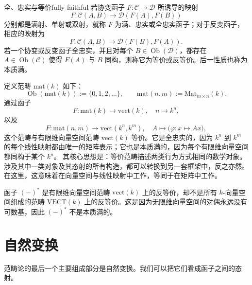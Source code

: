 \begin{definition}{全、忠实与等价}{fully-faithful}
若协变函子 $F\colon\mathcal C\to\mathcal D$ 所诱导的映射
\[
  F\colon\mathcal C(A,B)\to\mathcal D(F(A),F(B))
\]
分别都是满射、单射或双射，就称 $F$ 为满、忠实或全忠实函子；对于反变函子，相应的映射为
\[
  F\colon\mathcal C(A,B)\to\mathcal D(F(B),F(A)).
\]若一个协变或反变函子全忠实，并且对每个 $B\in\operatorname{Ob}(\mathcal D)$，都存在 $A\in\operatorname{Ob}(\mathcal C)$ 使得 $F(A)$ 与 $B$ 同构，则称它为等价或反等价。后一性质也称为本质满。
\end{definition}

\begin{example}[矩阵范畴]\label{ex:matrix-category}
定义范畴 $\mathrm{mat}(k)$ 如下：
\[
\operatorname{Ob}(\mathrm{mat}(k)):=\{0,1,2,\ldots\},\qquad
\mathrm{mat}(n,m):=\mathrm{Mat}_{m\times n}(k).
\]
通过函子
\[
F\colon\mathrm{mat}(k)\to\mathrm{vect}(k),\quad n\longmapsto k^n,
\]
以及
\[
F\colon\mathrm{mat}(n,m)\to\mathrm{vect}(k^n,k^m),\quad
A\longmapsto\bigl(\varphi\colon x\longmapsto Ax\bigr),
\]
这个范畴与有限维向量空间范畴 $\mathrm{vect}(k)$ 等价。它是全忠实的，因为 $k^n$ 到 $k^m$ 的每个线性映射都由唯一的矩阵表示；它也是本质满的，因为每个有限维向量空间都同构于某个 $k^n$。
其核心思想是：等价范畴描述两类行为方式相同的数学对象。涉及其中一类对象及其态射的所有构造，都可以转换到另一套框架中，反之亦然。在这里，这意味着在向量空间与线性映射中工作，等同于在矩阵中工作。
\end{example}

\begin{example}[有限维对偶给出的反等价]\label{ex:dual-antiequivalence}
函子 $(-)^*$ 是有限维向量空间范畴 $\mathrm{vect}(k)$ 上的反等价，却不是所有 $k$-向量空间组成的范畴 $\mathrm{VECT}(k)$ 上的反等价。这是因为无限维向量空间的对偶永远没有可数基，因此 $(-)^*$ 不是本质满的。
\end{example}

\section{自然变换}\label{sec:natural-transformations}
范畴论的最后一个主要组成部分是自然变换。我们可以把它们看成函子之间的态射。

